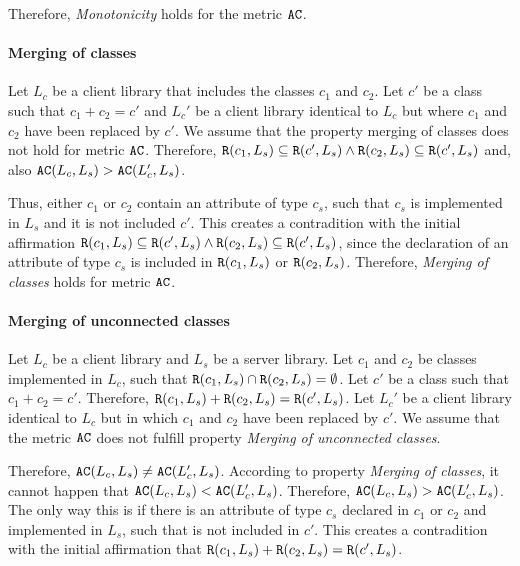 Therefore, \textit{Monotonicity} holds for the metric $\verb|AC|$.

\paragraph{Merging of classes}
Let $L_c$ be a client library that includes the classes $c_1$ and $c_2$. Let $c'$ be a class such that $c_1 + c_2 = c'$ and $L_c'$ be a client library identical to $L_c$ but where $c_1$ and $c_2$ have been replaced by $c'$. We assume that the property merging of classes does not hold for metric $\verb|AC|$. Therefore, $\verb|R|(c_1, L_s) \subseteq \verb|R|(c', L_s) \land \verb|R|(c_2, L_s) \subseteq \verb|R|(c', L_s)$ and, also $\verb|AC|(L_c, L_s) > \verb|AC|(L_c', L_s)$.

Thus, either $c_1$ or $c_2$ contain an attribute of type $c_s$, such that $c_s$ is implemented in $L_s$ and it is not included $c'$. This creates a contradition with the initial affirmation $\verb|R|(c_1, L_s) \subseteq \verb|R|(c', L_s) \land \verb|R|(c_2, L_s) \subseteq \verb|R|(c', L_s)$, since the declaration of an attribute of type $c_s$ is included in $\verb|R|(c_1, L_s)$ or $\verb|R|(c_2, L_s)$. Therefore, \textit{Merging of classes} holds for metric $\verb|AC|$.

\paragraph{Merging of unconnected classes}
Let $L_c$ be a client library and $L_s$ be a server library. Let $c_1$ and $c_2$ be classes implemented in $L_c$, such that $\verb|R|(c_1, L_s) \cap \verb|R|(c_2, L_s) = \emptyset$. Let $c'$ be a class such that $c_1 + c_2 = c'$. Therefore, $\verb|R|(c_1, L_s) + \verb|R|(c_2, L_s) = \verb|R|(c', L_s)$. Let $L_c'$ be a client library identical to $L_c$ but in which $c_1$ and $c_2$ have been replaced by $c'$. We assume that the metric $\verb|AC|$ does not fulfill property \textit{Merging of unconnected classes}.

Therefore, $\verb|AC|(L_c, L_s) \neq \verb|AC|(L_c', L_s)$. According to property \textit{Merging of classes}, it cannot happen that $\verb|AC|(L_c, L_s) < \verb|AC|(L_c', L_s)$. Therefore, $\verb|AC|(L_c, L_s) > \verb|AC|(L_c', L_s)$. The only way this is if there is an attribute of type $c_s$ declared in $c_1$ or $c_2$ and implemented in $L_s$, such that is not included in $c'$. This creates a contradition with the initial affirmation that $\verb|R|(c_1, L_s) + \verb|R|(c_2, L_s) = \verb|R|(c', L_s)$.

